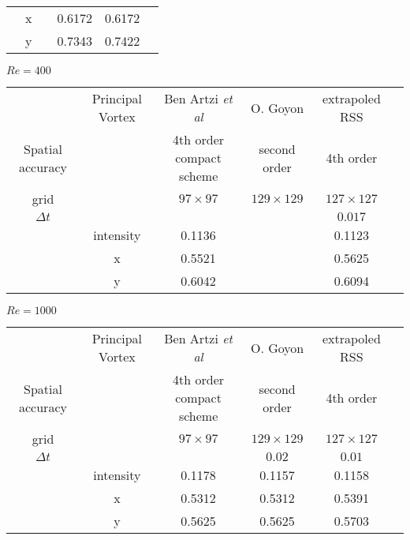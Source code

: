 {\begin{table}[!ht]
\begin{center}
\begin{tabular}{| c|c|c|c|c|c | }
  & x &   & 0.6172 & 0.6172 \\ 

  & y &   & 0.7343 & 0.7422 \\ 
\hline 
\end{tabular}


\vspace{0.5cm}


$Re=400$

\begin{tabular}{| c|c|c|c|c|c | }
\hline 
 & Principal Vortex  & Ben Artzi {\it et al} \cite{BenArtziCroisille} & O. Goyon \cite{Goyon} & extrapoled RSS \\ 
Spatial accuracy &                  & 4th order compact scheme                        & second order      &   4th order          \\
\hline 
grid &   & $97 \times 97$ & $ 129 \times 129$ & $127 \times 127$ \\ 
\hline
 $\Delta t$&  & & &$0.017$\\
 \hline
& intensity & 0.1136 &   & 0.1123 \\ 

  & x & 0.5521 &   & 0.5625 \\ 

  & y & 0.6042 &   & 0.6094 \\ 
\hline 
\end{tabular}

\vspace{0.5cm}

$Re=1000$

\begin{tabular}{| c|c|c|c|c|c | }
\hline 
 & Principal Vortex  & Ben Artzi {\it et al} \cite{BenArtziCroisille} & O. Goyon \cite{Goyon} & extrapoled RSS \\ 
Spatial accuracy &                  & 4th order compact scheme                        & second order      &   4th order          \\
\hline 
grid &   & $97 \times 97$ & $ 129 \times 129$ & $127 \times 127$ \\ 
\hline
$\Delta t$ & & &$0.02$ & $0.01$\\ 
\hline
&  intensity  & 0.1178 & 0.1157 & 0.1158 \\ 

  & x & 0.5312 & 0.5312 & 0.5391 \\ 
 
  & y & 0.5625 & 0.5625 & 0.5703 \\ 
\hline 
\end{tabular}


\end{center}
\end{table}}

